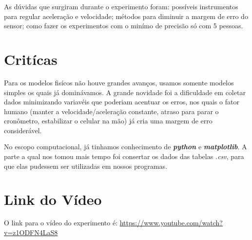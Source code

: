 \documentclass[a4paper, 12pt]{article}
\begin{document}
As dúvidas que surgiram durante o experimento foram: possíveis instrumentos para
regular aceleração e velocidade; métodos para diminuir a margem de erro do
sensor; como fazer os experimentos com o minímo de precisão só com 5 pessoas.

\section*{Critícas}
Para os modelos fisícos não houve grandes avanços, usamos somente modelos
simples os quais já dominávamos. A grande novidade foi a dificuldade em coletar
dados minimizando variavéis que poderiam acentuar os erros, nos quais o fator
humano (manter a velocidade/aceleração constante, atraso para parar o
cronômetro, estabilizar o celular na mão) já cria uma margem de erro considerável. 

No escopo computacional, já tinhamos conhecimento de \textit{\textbf{python}} e
\textit{\textbf{matplotlib}}. A parte a qual nos tomou mais tempo foi consertar
os dados das tabelas \textit{.csv}, para que elas pudessem ser utilizadas em
nossos programas.

\section*{Link do Vídeo}
O link para o vídeo do experimento é:
\url{https://www.youtube.com/watch?v=z1ODFN4LaS8}
\end{document}
